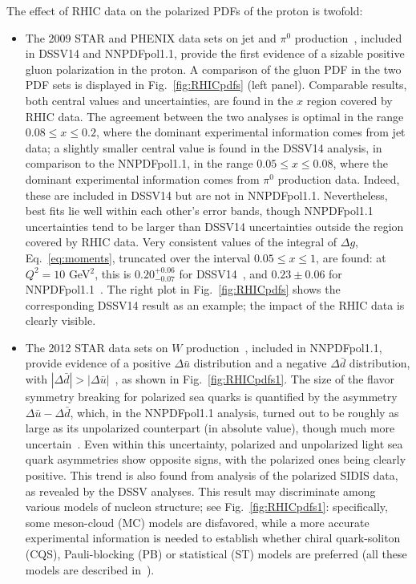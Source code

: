 The effect of RHIC data on the polarized PDFs of the proton is twofold:
\begin{itemize}

\item The 2009 STAR and PHENIX data sets on jet and $\pi^0$ 
production~\cite{Adamczyk:2014ozi,Adare:2014hsq}, included in DSSV14
and NNPDFpol1.1, provide the first evidence
of a sizable positive gluon polarization in the proton. 
%
A comparison of the gluon PDF in the two PDF sets is displayed in 
Fig.~\ref{fig:RHICpdfs} (left panel). 
%
Comparable results, both central values and uncertainties, are found in the 
$x$ region covered by RHIC data. 
%
The agreement between the two analyses is optimal in the
range $0.08\leq x \leq 0.2$, where the dominant experimental information comes
from jet data; a slightly smaller central value is found in the DSSV14 
analysis, in comparison to the NNPDFpol1.1, in the range 
$0.05\leq x \leq 0.08$, where the dominant experimental information comes from 
$\pi^0$ production data. 
%
Indeed, these are included in DSSV14 but are not
in NNPDFpol1.1. 
%
Nevertheless, best fits lie well within each other's error
bands, though NNPDFpol1.1 uncertainties tend to be larger than DSSV14
uncertainties outside the region covered by RHIC data.
%
Very consistent values of the integral of $\Delta g$, 
Eq.~\eqref{eq:moments}, truncated over the interval $0.05\leq x \leq 1$, are 
found: at $Q^2=10$ GeV$^2$, this is $0.20^{+0.06}_{-0.07}$ for 
DSSV14~\cite{deFlorian:2014yva}, and $0.23\pm 0.06$ for 
NNPDFpol1.1~\cite{Nocera:2014gqa}. The right plot in Fig.~\ref{fig:RHICpdfs} 
shows the corresponding DSSV14 result as an example; the impact of the RHIC
data is clearly visible. 

\item The 2012 STAR data sets on $W$ production~\cite{Adamczyk:2014xyw}, 
included in NNPDFpol1.1, provide evidence of a positive 
$\Delta\bar{u}$ distribution 
and a negative $\Delta\bar{d}$ distribution, with 
$|\Delta\bar{d}|>|\Delta\bar{u}|$~\cite{Nocera:2014gqa},
as shown in Fig.~\ref{fig:RHICpdfs1}.
% 
The size of the flavor symmetry breaking for polarized sea quarks is 
quantified by the asymmetry $\Delta\bar{u}-\Delta\bar{d}$, which,
in the NNPDFpol1.1 analysis, turned out to be roughly as large as its 
unpolarized counterpart (in absolute value), 
though much more uncertain~\cite{Nocera:2014rea}. 
%
Even within this uncertainty, polarized and unpolarized light sea quark 
asymmetries show opposite signs,
with the polarized ones being clearly positive.  This trend is also found
from analysis of the polarized SIDIS data, as revealed by the DSSV analyses. 
%
This result may discriminate among various models of nucleon structure; 
see Fig.~\ref{fig:RHICpdfs1}: 
specifically, some meson-cloud (MC) models are disfavored, while a more 
accurate experimental information is needed to establish whether 
chiral quark-soliton (CQS), Pauli-blocking (PB) or statistical (ST)
models are preferred (all these models are described in~\cite{Chang:2014jba}).

\end{itemize}

